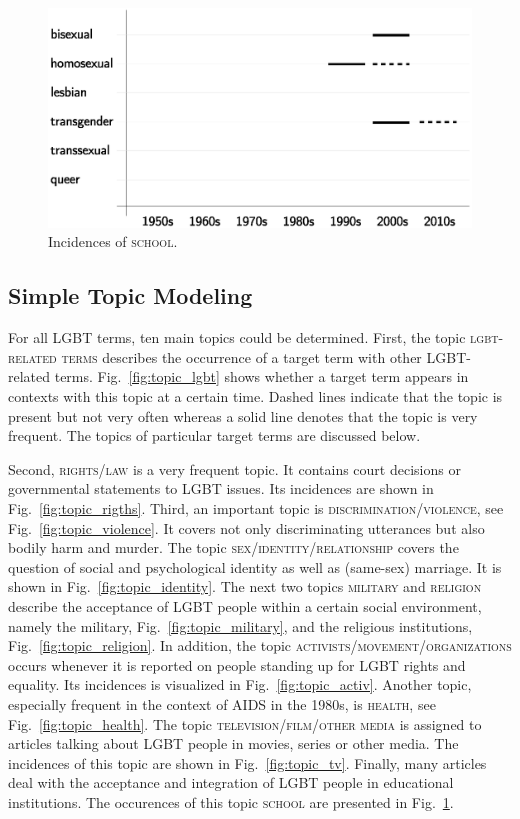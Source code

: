 \documentclass[10pt,a4paper,twocolumn]{scrartcl}
\begin{document}
\begin{figure}
\begin{minipage}{0.48\textwidth}
\includegraphics[width=\columnwidth]{figures/topic_school}
\caption{Incidences of \textsc{school}.} \label{fig:topic_school}
\end{minipage}
\end{figure}

\subsection{Simple Topic Modeling}
For all LGBT terms, ten main topics could be determined. First, the topic \textsc{lgbt-related terms} describes the occurrence of a target term with other LGBT-related terms. Fig.~\ref{fig:topic_lgbt} shows whether a target term appears in contexts with this topic at a certain time. Dashed lines indicate that the topic is present but not very often whereas a solid line denotes that the topic is very frequent. The topics of particular target terms are discussed below.

Second, \textsc{rights/law} is a very frequent topic. It contains court decisions or governmental statements to LGBT issues. Its incidences are shown in Fig.~\ref{fig:topic_rigths}. Third, an important topic is \textsc{discrimination/violence}, see Fig.~\ref{fig:topic_violence}. It covers not only discriminating utterances but also bodily harm and murder. The topic \textsc{sex/identity/relationship} covers the question of social and psychological identity as well as (same-sex) marriage. It is shown in Fig.~\ref{fig:topic_identity}. The next two topics \textsc{military} and \textsc{religion} describe the acceptance of LGBT people within a certain social environment, namely the military, Fig.~\ref{fig:topic_military}, and the religious institutions, Fig.~\ref{fig:topic_religion}. In addition, the topic \textsc{activists/movement/organizations} occurs whenever it is reported on people standing up for LGBT rights and equality. Its incidences is visualized in Fig.~\ref{fig:topic_activ}. Another topic, especially frequent in the context of AIDS in the 1980s, is \textsc{health}, see Fig.~\ref{fig:topic_health}. The topic \textsc{television/film/other media} is assigned to articles talking about LGBT people in movies, series or other media. The incidences of this topic are shown in Fig.~\ref{fig:topic_tv}. Finally, many articles deal with the acceptance and integration of LGBT people in educational institutions. The occurences of this topic \textsc{school} are presented in Fig.~\ref{fig:topic_school}.
\end{document}

